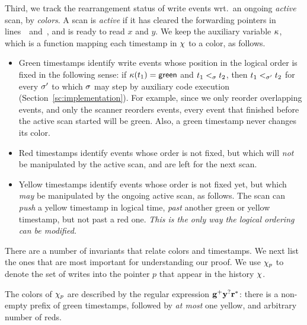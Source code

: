 Third, we track the rearrangement status of write events wrt.~an
ongoing \emph{active} scan, by \emph{colors}. A scan is \emph{active}
if it has cleared the forwarding pointers in
lines~\lineScanClearsX\ and\ \lineScanClearsY, and is ready to read
$x$ and $y$. We keep the auxiliary variable $\kappa$, which is a function
mapping each timestamp in $\chi$ to a color, as follows.
%
%
\begin{itemize}
\item {\sf Green} timestamps identify write events whose position in
  the logical order is fixed in the following sense: if $\kappa(t_1) =
  \mathsf{green}$ and $t_1 \mathrel{<_\sigma} t_2$, then $t_1 <_{\sigma'} t_2$ for
  every $\sigma'$ to which $\sigma$ may step by auxiliary code
  execution (Section~\ref{sc:implementation}). For example, since we
  only reorder overlapping events, and only the scanner reorders
  events, every event that finished before the active scan started
  will be green. Also, a green timestamp never changes its color.

\item {\sf Red} timestamps identify events whose order is not fixed,
  but which will \emph{not} be manipulated by the active scan, and are
  left for the next scan.

\item {\sf Yellow} timestamps identify events whose order is not fixed
  yet, but which \emph{may} be manipulated by the ongoing active scan,
  as follows.  The scan can \emph{push} a yellow timestamp in logical
  time, \emph{past} another green or yellow timestamp, but not past a
  red one. \emph{This is the only way the logical ordering can be
    modified.}

%
\end{itemize}
%

There are a number of invariants that relate colors and timestamps. We
next list the ones that are most important for understanding our
proof. We use $\chi_p$ to denote the set of writes into the pointer
$p$ that appear in the history $\chi$.

\begin{invariant}[Colors]\label{inv:color}%
The colors of $\chi_p$ are described by the regular expression ${\mathbf{{g^{+}}{y^{?}}{r^{*}}}}$:
there is a non-empty prefix of green timestamps, followed by \emph{at
  most} one yellow, and arbitrary number of reds.
\end{invariant}

